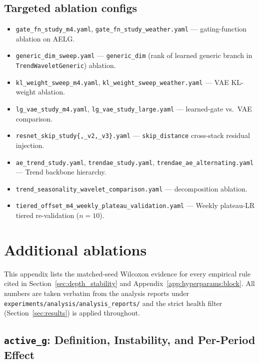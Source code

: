 \documentclass[11pt,a4paper]{article}
\begin{document}
\subsection{Targeted ablation configs}
\label{app:configs:ablations}

\begin{itemize}\itemsep -1pt
\item \texttt{gate\_fn\_study\_m4.yaml}, \texttt{gate\_fn\_study\_weather.yaml} --- gating-function ablation on AELG.
\item \texttt{generic\_dim\_sweep.yaml} --- \texttt{generic\_dim} (rank of learned generic branch in \texttt{TrendWaveletGeneric}) ablation.
\item \texttt{kl\_weight\_sweep\_m4.yaml}, \texttt{kl\_weight\_sweep\_weather.yaml} --- VAE KL-weight ablation.
\item \texttt{lg\_vae\_study\_m4.yaml}, \texttt{lg\_vae\_study\_large.yaml} --- learned-gate vs.\ VAE comparison.
\item \texttt{resnet\_skip\_study\{,\_v2,\_v3\}.yaml} --- \texttt{skip\_distance} cross-stack residual injection.
\item \texttt{ae\_trend\_study.yaml}, \texttt{trendae\_study.yaml}, \texttt{trendae\_ae\_alternating.yaml} --- Trend backbone hierarchy.
\item \texttt{trend\_seasonality\_wavelet\_comparison.yaml} --- decomposition ablation.
\item \texttt{tiered\_offset\_m4\_weekly\_plateau\_validation.yaml} --- Weekly plateau-LR tiered re-validation ($n=10$).
\end{itemize}


\section{Additional ablations}
\label{app:ablations}

This appendix lists the matched-seed Wilcoxon evidence for every empirical rule cited in Section~\ref{sec:depth_stability} and Appendix~\ref{app:hyperparams:block}. All numbers are taken verbatim from the analysis reports under \texttt{experiments/analysis/analysis\_reports/} and the strict health filter (Section~\ref{sec:results}) is applied throughout.

\subsection{\texttt{active\_g}: Definition, Instability, and Per-Period Effect}
\label{app:ablations:active_g}
\end{document}
